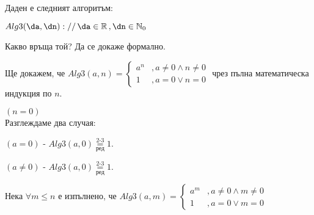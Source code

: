 \begin{problem}
	Даден е следният алгоритъм:
	\begin{pseudocode}
		
		$Alg3(\da,\dn)://\,\da\in\mathbb{R}\,,\dn\in\mathbb{N}_0$
		\Mybegin
		{
			
			
		}
	\end{pseudocode}
	Какво връща той? Да се докаже формално.
\end{problem}
\begin{solution}
	Ще докажем, че $Alg3(a,n)=\begin{cases}
		a^n &,a\ne0\land n\ne0\\
		1   &,a=0\lor n=0
	\end{cases}$ чрез пълна математическа индукция по $n$.
\end{solution}
\begin{base}
	$(n=0)$\\Разглеждаме два случая:
	\begin{mycase}
		\item $(a=0)$ - $Alg3(a,0)\underset{\text{ред}}{\overset{\text{2-3}}=}1$.
		\item $(a\ne0)$ - $Alg3(a,0)\underset{\text{ред}}{\overset{\text{2-3}}=}1$.
	\end{mycase}
\end{base}
\begin{indhypothesis}
	Нека $\forall m\le n$ е изпълнено, че $Alg3(a,m)=\begin{cases}
		a^m &,a\ne0\land m\ne0\\
		1   &,a=0\lor m=0
	\end{cases}$
\end{indhypothesis}
